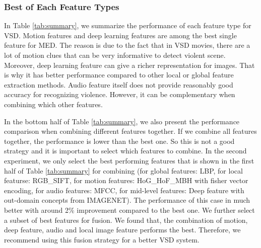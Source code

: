 \documentclass[twocolumn]{bmcart}%
\begin{document}
\subsubsection{Best of Each Feature Types}
In Table \ref{tab:summary}, we summarize the performance of each feature type for VSD. Motion features and deep learning features are among the best single feature for MED. The reason is due to the fact that in VSD movies, there are a lot of motion clues that can be very informative to detect violent scene. Moreover, deep learning feature can give a richer representation for images. That is why it has better performance compared to other local or global feature extraction methods. Audio feature itself does not provide reasonably good accuracy for recognizing violence. However, it can be complementary when combining which other features. 

In the bottom half of Table \ref{tab:summary}, we also present the performance comparison when combining different features together. If we combine all features together, the performance is lower than the best one. So this is not a good strategy and it is important to select which features to combine. In the second experiment, we only select the best performing features that is shown in the first half of Table \ref{tab:summary} for combining (for global features: LBP, for local featurse: RGB\_SIFT, for motion features: HoG\_HoF\_MBH with fisher vector encoding, for audio features: MFCC, for mid-level features: Deep feature with out-domain concepts from IMAGENET). The performance of this case in much better with around 2\% improvement compared to the best one. We further select a subset of best features for fusion. We found that, the combination of motion, deep feature, audio and local image feature performs the best. Therefore, we recommend using this fusion strategy for a better VSD system.
\end{document}
